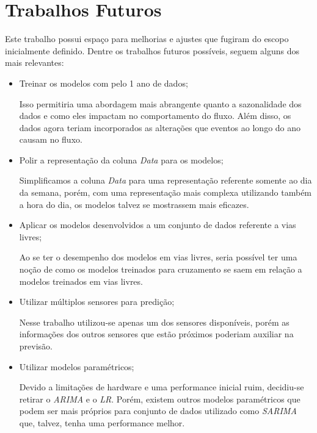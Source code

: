 \section{Trabalhos Futuros}

Este trabalho possui espaço para melhorias e ajustes que fugiram do escopo inicialmente definido. Dentre os trabalhos futuros possíveis, seguem alguns dos mais relevantes:

\begin{itemize}
    \item Treinar os modelos com pelo 1 ano de dados;
    
    Isso permitiria uma abordagem mais abrangente quanto a sazonalidade dos dados e como eles impactam no comportamento do fluxo. Além disso, os dados agora teriam incorporados as alterações que eventos ao longo do ano causam no fluxo.
    
    \item Polir a representação da coluna  \textit{Data} para os modelos;
    
    Simplificamos a coluna \textit{Data} para uma representação referente somente ao dia da semana, porém, com uma representação mais complexa utilizando também a hora do dia, os modelos talvez se mostrassem mais eficazes.
    \item Aplicar os modelos desenvolvidos a um conjunto de dados referente a vias livres;
    
    Ao se ter o desempenho dos modelos em vias livres, seria possível ter uma noção de como os modelos treinados para cruzamento se saem em relação a modelos treinados em vias livres.
    
    \item Utilizar múltiplos sensores para predição;
    
    Nesse trabalho utilizou-se apenas um dos sensores disponíveis, porém as informações dos outros sensores que estão próximos poderiam auxiliar na previsão.
    
    \item Utilizar modelos paramétricos;
    
    Devido a limitações de hardware e uma performance inicial ruim, decidiu-se retirar o \textit{\acrfull{ARIMA}} e o \textit{\acrfull{LR}}. Porém, existem outros modelos paramétricos que podem ser mais próprios para conjunto de dados utilizado como \textit{\acrfull{SARIMA}} que, talvez, tenha uma performance melhor.
    

\end{itemize}
